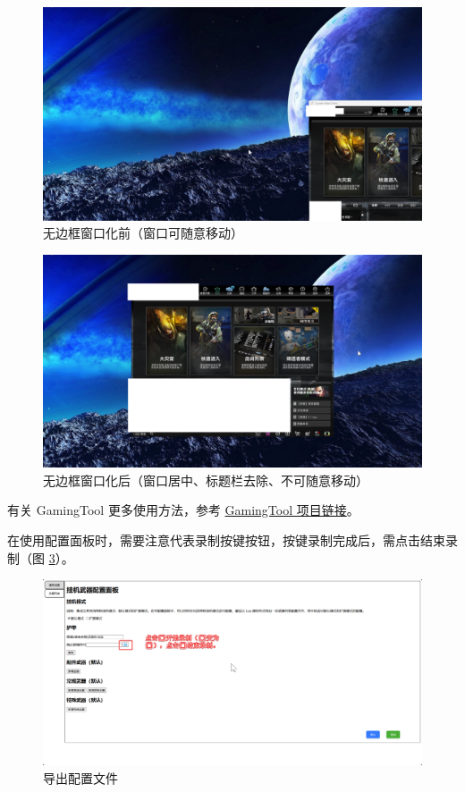 \begin{figure}
    \Centering
    \includegraphics[width=\textwidth]{assets/before-make-borderless.png}
    \caption{无边框窗口化前（窗口可随意移动）}
    \label{ch2fig-before-make-borderless}
\end{figure}

\begin{figure}
    \Centering
    \includegraphics[width=\textwidth]{assets/after-make-borderless.png}
    \caption{无边框窗口化后（窗口居中、标题栏去除、不可随意移动）}
    \label{ch2fig-after-make-borderless}
\end{figure}

有关 GamingTool 更多使用方法，参考 \href{https://gitee.com/silver1867/gaming-tool}{GamingTool 项目链接}。

在使用配置面板时，需要注意️代表录制按键按钮，按键录制完成后，需点击结束录制（图 \ref{ch2fig-about-recording}）。

\begin{figure}[H]
    \Centering
    \includegraphics[width=\textwidth]{assets/about_recording}
    \caption{导出配置文件}
    \label{ch2fig-about-recording}
\end{figure}

